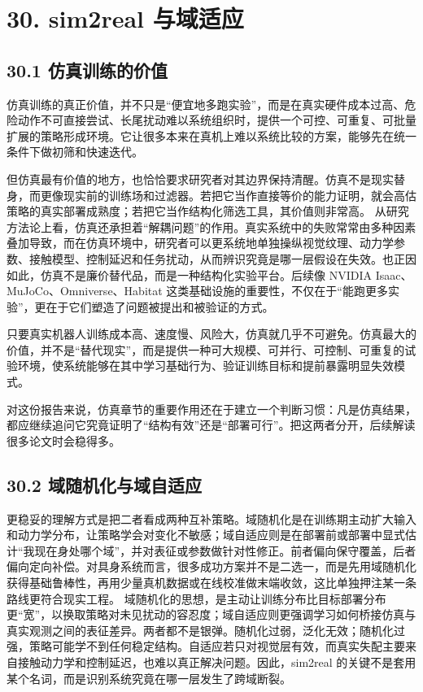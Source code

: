 \chapter*{30. sim2real 与域适应}

\section*{30.1 仿真训练的价值}


仿真训练的真正价值，并不只是“便宜地多跑实验”，而是在真实硬件成本过高、危险动作不可直接尝试、长尾扰动难以系统组织时，提供一个可控、可重复、可批量扩展的策略形成环境。它让很多本来在真机上难以系统比较的方案，能够先在统一条件下做初筛和快速迭代。

但仿真最有价值的地方，也恰恰要求研究者对其边界保持清醒。仿真不是现实替身，而更像现实前的训练场和过滤器。若把它当作直接等价的能力证明，就会高估策略的真实部署成熟度；若把它当作结构化筛选工具，其价值则非常高。 从研究方法论上看，仿真还承担着“解耦问题”的作用。真实系统中的失败常常由多种因素叠加导致，而在仿真环境中，研究者可以更系统地单独操纵视觉纹理、动力学参数、接触模型、控制延迟和任务扰动，从而辨识究竟是哪一层假设在失效。也正因如此，仿真不是廉价替代品，而是一种结构化实验平台。后续像 NVIDIA Isaac、MuJoCo、Omniverse、Habitat 这类基础设施的重要性，不仅在于“能跑更多实验”，更在于它们塑造了问题被提出和被验证的方式。

只要真实机器人训练成本高、速度慢、风险大，仿真就几乎不可避免。仿真最大的价值，并不是“替代现实”，而是提供一种可大规模、可并行、可控制、可重复的试验环境，使系统能够在其中学习基础行为、验证训练目标和提前暴露明显失效模式。

对这份报告来说，仿真章节的重要作用还在于建立一个判断习惯：凡是仿真结果，都应继续追问它究竟证明了“结构有效”还是“部署可行”。把这两者分开，后续解读很多论文时会稳得多。

\section*{30.2 域随机化与域自适应}


更稳妥的理解方式是把二者看成两种互补策略。域随机化是在训练期主动扩大输入和动力学分布，让策略学会对变化不敏感；域自适应则是在部署前或部署中显式估计“我现在身处哪个域”，并对表征或参数做针对性修正。前者偏向保守覆盖，后者偏向定向补偿。对具身系统而言，很多成功方案并不是二选一，而是先用域随机化获得基础鲁棒性，再用少量真机数据或在线校准做末端收敛，这比单独押注某一条路线更符合现实工程。 域随机化的思想，是主动让训练分布比目标部署分布更“宽”，以换取策略对未见扰动的容忍度；域自适应则更强调学习如何桥接仿真与真实观测之间的表征差异。两者都不是银弹。随机化过弱，泛化无效；随机化过强，策略可能学不到任何稳定结构。自适应若只对视觉层有效，而真实失配主要来自接触动力学和控制延迟，也难以真正解决问题。因此，sim2real 的关键不是套用某个名词，而是识别系统究竟在哪一层发生了跨域断裂。

